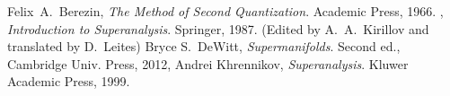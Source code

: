 \begin{thebibliography}{99}

Felix~A.~Berezin,
\textit{The Method of Second Quantization}.
Academic Press, 1966.
\bysame, %
\textit{Introduction to Superanalysis}.
Springer, 1987.\newline
(Edited by A.~A.~Kirillov and translated by D.~Leites)
  Bryce S.~DeWitt,
  \textit{Supermanifolds}.
Second ed., Cambridge Univ. Press, 2012,
{\tt{}}
Andrei Khrennikov,
 \emph{Superanalysis}.
Kluwer Academic Press, 1999.
\end{thebibliography}
